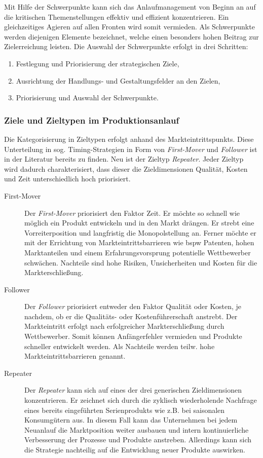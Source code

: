 Mit Hilfe der Schwerpunkte kann sich das Anlaufmanagement von Beginn an auf die kritischen Themenstellungen effektiv und effizient konzentrieren. Ein gleichzeitiges Agieren auf allen Fronten wird somit vermieden. Als Schwerpunkte werden diejenigen Elemente bezeichnet, welche einen besonders hohen Beitrag zur Zielerreichung leisten. 
Die Auswahl der Schwerpunkte erfolgt in drei Schritten: 
\begin{enumerate}
 \item Festlegung und Priorisierung der strategischen Ziele,
 \item Ausrichtung der Handlungs- und Gestaltungsfelder an den Zielen,
 \item Priorisierung und Auswahl der Schwerpunkte.
\end{enumerate}

\subsubsection{Ziele und Zieltypen im Produktionsanlauf}
Die Kategorisierung in Zieltypen erfolgt anhand des Markteintrittspunkts. Diese Unterteilung in sog. Timing-Strategien in Form von \textit{First-Mover} und \textit{Follower} ist in der Literatur bereits zu finden. Neu ist der Zieltyp \textit{Repeater}. Jeder Zieltyp wird dadurch charakterisiert, dass dieser die Zieldimensionen Qualität, Kosten und Zeit unterschiedlich hoch priorisiert. 

\begin{description}
\item[First-Mover] Der \textit{First-Mover} priorisiert den Faktor Zeit. Er möchte so schnell wie möglich ein Produkt entwickeln und in den Markt drängen. Er strebt eine Vorreiterposition und langfristig die Monopolstellung an. Ferner möchte er mit der Errichtung von Markteintrittsbarrieren wie \gls{bspw} Patenten, hohen Marktanteilen und einem Erfahrungsvorsprung potentielle Wettbewerber schwächen. 
Nachteile sind hohe Risiken, Unsicherheiten und Kosten für die Markterschließung. 

\item[Follower] Der \textit{Follower} priorisiert entweder den Faktor Qualität oder Kosten, je nachdem, ob er die Qualitäts- oder Kostenführerschaft anstrebt. Der Markteintritt erfolgt nach erfolgreicher Markterschließung durch Wettbewerber. Somit können Anfängerfehler vermieden und Produkte schneller entwickelt werden. Als Nachteile werden teilw. hohe Markteintrittsbarrieren genannt. 

\item[Repeater] Der \textit{Repeater} kann sich auf eines der drei generischen Zieldimensionen konzentrieren. Er zeichnet sich durch die zyklisch wiederholende Nachfrage eines bereits eingeführten Serienprodukts wie z.B. bei saisonalen Konsumgütern aus. In diesem Fall kann das Unternehmen bei jedem Neuanlauf die Marktposition weiter ausbauen und intern kontinuierliche Verbesserung der Prozesse und Produkte anstreben. Allerdings kann sich die Strategie nachteilig auf die Entwicklung neuer Produkte auswirken. 
\end{description}


